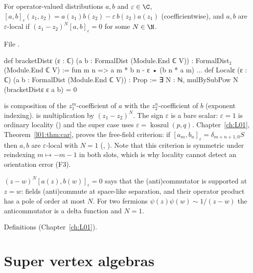 \begin{definition}\label{l17:def:localeps}
For operator-valued distributions $a,b$ and $\varepsilon\in\C$,
$[a,b]_\varepsilon(z_1,z_2)=a(z_1)b(z_2)-\varepsilon\,b(z_2)a(z_1)$ (coefficientwise), and $a,b$ are
$\varepsilon$-local if $(z_1-z_2)^N[a,b]_\varepsilon=0$ for some $N\in\N$.
\end{definition}
\noindent File .
\begin{leancode}
def bracketDistε (ε : ℂ) (a b : FormalDist (Module.End ℂ V)) : FormalDist₂ (Module.End ℂ V) :=
  fun m n => a m * b n - ε • (b n * a m)
...
def Localε (ε : ℂ) (a b : FormalDist (Module.End ℂ V)) : Prop :=
  ∃ N : ℕ, mulBySubPow N (bracketDistε ε a b) = 0
\end{leancode}
\begin{dictionary}
 is composition of the $z_1^m$-coefficient of $a$ with the $z_2^n$-coefficient of $b$
(exponent indexing).  is multiplication by $(z_1-z_2)^N$. The sign $\varepsilon$ is
a bare scalar: $\varepsilon=1$ is ordinary locality () and the super case uses
$\varepsilon=\operatorname{koszul}(p,q)$. Chapter~\ref{ch:L01}, Theorem~\ref{l01:thm:car}, proves the
free-field criterion: if $[a_m,b_n]_\varepsilon=\delta_{m+n+1,0}S$ then $a,b$ are $\varepsilon$-local
with $N=1$ (, ). Note that this criterion is
symmetric under reindexing $m\mapsto-m-1$ in both slots, which is why locality cannot detect an
orientation error (F3).
\end{dictionary}
\begin{physics}
$(z-w)^N[a(z),b(w)]_\varepsilon=0$ says that the (anti)commutator is supported at $z=w$: fields
(anti)commute at space-like separation, and their operator product has a pole of order at most $N$.
For two fermions $\psi(z)\psi(w)\sim 1/(z-w)$ the anticommutator is a delta function and $N=1$.
\end{physics}
\begin{status}
Definitions (Chapter~\ref{ch:L01}).
\end{status}

\section{Super vertex algebras}\label{l17:sec:sva}

